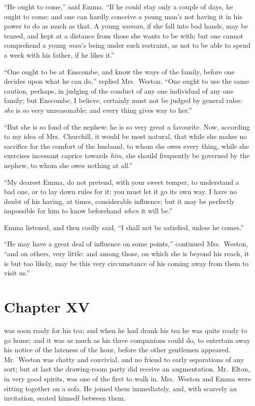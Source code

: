 ``He ought to come,'' said Emma.  ``If he could stay only a couple
of days, he ought to come; and one can hardly conceive a young man's
not having it in his power to do as much as that.  A young \emph{woman},
if she fall into bad hands, may be teazed, and kept at a distance
from those she wants to be with; but one cannot comprehend a young
\emph{man}'s being under such restraint, as not to be able to spend a week
with his father, if he likes it.''

``One ought to be at Enscombe, and know the ways of the family,
before one decides upon what he can do,'' replied Mrs.\ Weston.
``One ought to use the same caution, perhaps, in judging of the
conduct of any one individual of any one family; but Enscombe,
I believe, certainly must not be judged by general rules:
\emph{she} is so very unreasonable; and every thing gives way to her.''

``But she is so fond of the nephew:  he is so very great a favourite.
Now, according to my idea of Mrs.\ Churchill, it would be most natural,
that while she makes no sacrifice for the comfort of the husband,
to whom she owes every thing, while she exercises incessant caprice
towards \emph{him}, she should frequently be governed by the nephew,
to whom she owes nothing at all.''

``My dearest Emma, do not pretend, with your sweet temper,
to understand a bad one, or to lay down rules for it:  you must
let it go its own way.  I have no doubt of his having, at times,
considerable influence; but it may be perfectly impossible for him
to know beforehand \emph{when} it will be.''

Emma listened, and then coolly said, ``I shall not be satisfied,
unless he comes.''

``He may have a great deal of influence on some points,''
continued Mrs.\ Weston, ``and on others, very little:  and among those,
on which she is beyond his reach, it is but too likely, may be
this very circumstance of his coming away from them to visit us.''



\chapter{Chapter XV}


 was soon ready for his tea; and when he had drank his
tea he was quite ready to go home; and it was as much as his three
companions could do, to entertain away his notice of the lateness
of the hour, before the other gentlemen appeared.  Mr.\ Weston was
chatty and convivial, and no friend to early separations of any sort;
but at last the drawing-room party did receive an augmentation.
Mr.\ Elton, in very good spirits, was one of the first to walk in.
Mrs.\ Weston and Emma were sitting together on a sofa.  He joined
them immediately, and, with scarcely an invitation, seated himself
between them.

